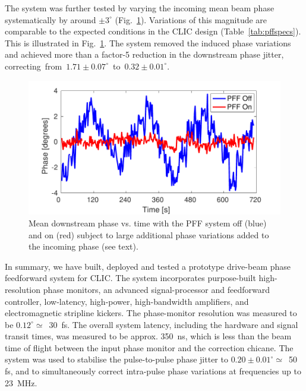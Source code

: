 \documentclass[%
 reprint,
 superscriptaddress,
 amsmath,
 amssymb,
 prl,
]{revtex4-1}
\begin{document}
The system was further tested by varying the incoming mean 
beam phase systematically by around \(\pm 3^\circ\) (Fig.~\ref{fig:wiggle}). 
Variations of this magnitude 
are comparable to the expected conditions in the CLIC design 
(Table~\ref{tab:pffspecs}). This is illustrated in Fig.~\ref{fig:wiggle}. The 
system removed the induced phase variations and achieved more than a factor-5 
reduction in the downstream phase jitter, 
correcting~from~\(1.71\pm0.07^\circ\)~to~\(0.32\pm0.01^\circ\). 

\begin{figure}
	\includegraphics[width=\columnwidth]{toSubmit/fig9}
	\caption{\label{fig:wiggle}Mean downstream phase vs. time with the PFF 
	system off (blue) and on (red) subject to large additional phase variations 
	added to the incoming phase (see text).}
\end{figure}


In summary, we have built, deployed and tested a prototype drive-beam phase 
feedforward system for CLIC.   The system incorporates purpose-built 
high-resolution phase 
monitors, an advanced signal-processor and feedforward controller, low-latency, 
high-power, high-bandwidth amplifiers, and electromagnetic stripline
kickers. The phase-monitor resolution was measured to be 
\(0.12^\circ\simeq\)~30~fs.  The overall system latency, including the hardware 
and signal transit times, was measured to be approx. 350~ns, which is less than 
the beam time of flight between the input phase monitor and the correction 
chicane.
The system was used to 
stabilise the pulse-to-pulse phase jitter to \(0.20\pm0.01^\circ\simeq\)~50 fs, 
and to simultaneously correct intra-pulse phase variations at frequencies up to 
23~MHz.
\end{document}
